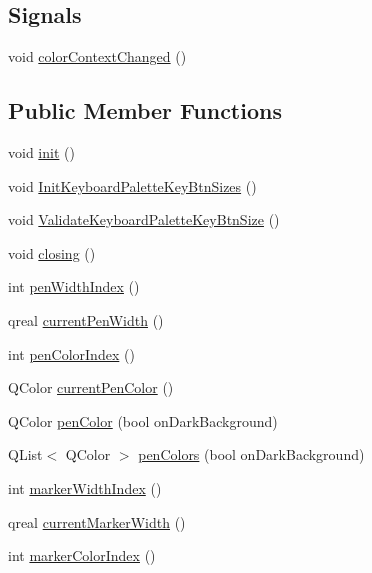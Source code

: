 \subsection*{Signals}
\begin{DoxyCompactItemize}
\item 
void \hyperlink{class_u_b_settings_a982d08ba0c3cc28ee49f240814a8ae57}{color\-Context\-Changed} ()
\end{DoxyCompactItemize}
\subsection*{Public Member Functions}
\begin{DoxyCompactItemize}
\item 
void \hyperlink{class_u_b_settings_a1df06c7bd1382b61d42c3c3f8400ec85}{init} ()
\item 
void \hyperlink{class_u_b_settings_afd0d739b2cfac7e2d05be7415f6692df}{Init\-Keyboard\-Palette\-Key\-Btn\-Sizes} ()
\item 
void \hyperlink{class_u_b_settings_ad955c1bb8ea95d412a69746326347bc3}{Validate\-Keyboard\-Palette\-Key\-Btn\-Size} ()
\item 
void \hyperlink{class_u_b_settings_ac6466b506dfb956b43f2c07a655e475c}{closing} ()
\item 
int \hyperlink{class_u_b_settings_a6ec1b63a496028bc006f9a360f10e74f}{pen\-Width\-Index} ()
\item 
qreal \hyperlink{class_u_b_settings_a3a73221011eb782c7e2c683a4a6f6fc7}{current\-Pen\-Width} ()
\item 
int \hyperlink{class_u_b_settings_a92682392a72ab8c73355572de1a21672}{pen\-Color\-Index} ()
\item 
Q\-Color \hyperlink{class_u_b_settings_ad4124c28d4b3ea74065ac5dc022bcdc7}{current\-Pen\-Color} ()
\item 
Q\-Color \hyperlink{class_u_b_settings_a27b620db7e6282d277935289450229a6}{pen\-Color} (bool on\-Dark\-Background)
\item 
Q\-List$<$ Q\-Color $>$ \hyperlink{class_u_b_settings_aedb07c4d22207e705dfabfe7497d078d}{pen\-Colors} (bool on\-Dark\-Background)
\item 
int \hyperlink{class_u_b_settings_af50bacac0c267fd53d838ff890d528f1}{marker\-Width\-Index} ()
\item 
qreal \hyperlink{class_u_b_settings_a44e5c098d00af50d9548f68cc07a54b5}{current\-Marker\-Width} ()
\item 
int \hyperlink{class_u_b_settings_a74efce0dd871313e0c9cabdc84a0a5d0}{marker\-Color\-Index} ()

\end{DoxyCompactItemize}
